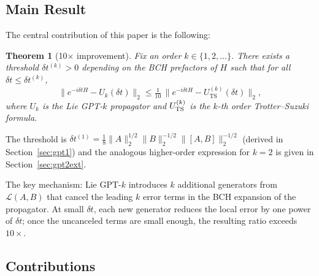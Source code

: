 \documentclass[aps,prxquantum,twocolumn,nofootinbib]{revtex4-2}
\newtheorem{theorem}{Theorem}
\begin{document}
\subsection{Main Result}

The central contribution of this paper is the following:

\begin{theorem}[10$\times$ improvement]
  \label{thm:main}
  Fix an order $k \in \{1, 2, \ldots\}$. There exists a threshold
  $\delta t^{(k)} > 0$ depending on the BCH prefactors of $H$ such
  that for all $\delta t \leq \delta t^{(k)}$,
  \begin{equation}
    \|e^{-i\delta t H} - U_k(\delta t)\|_2
    \leq
    \tfrac{1}{10}\, \|e^{-i\delta t H} - U^{(k)}_{\mathrm{TS}}(\delta t)\|_2,
    \label{eq:main-claim}
  \end{equation}
  where $U_k$ is the Lie GPT-$k$ propagator and $U^{(k)}_{\rm TS}$ is
  the $k$-th order Trotter--Suzuki formula.
\end{theorem}

The threshold is $\delta t^{(1)} = \tfrac{1}{8}
\|A\|_2^{1/2}\|B\|_2^{-1/2}\|[A,B]\|_2^{-1/2}$
(derived in Section~\ref{sec:gpt1}) and the analogous higher-order
expression for $k=2$ is given in Section~\ref{sec:gpt2ext}.

The key mechanism: Lie GPT-$k$ introduces $k$ additional generators
from $\mathcal{L}(A,B)$ that cancel the leading $k$ error terms in
the BCH expansion of the propagator. At small $\delta t$, each new
generator reduces the local error by one power of $\delta t$; once
the uncanceled terms are small enough, the resulting ratio exceeds
$10\times$.

\subsection{Contributions}
\end{document}
